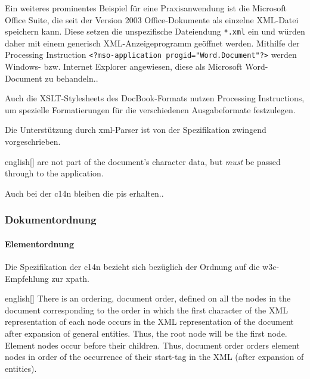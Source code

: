 Ein weiteres prominentes Beispiel für eine Praxisanwendung ist die Microsoft Office Suite, die seit der Version 2003 Office-Dokumente als einzelne XML-Datei speichern kann. Diese setzen die unspezifische Dateiendung \texttt{*.xml} ein und würden daher mit einem generisch XML-Anzeigeprogramm geöffnet werden. Mithilfe der Processing Instruction \texttt{<?mso-application progid="Word.Document"?>} werden Windows- bzw. Internet Explorer angewiesen, diese als Microsoft Word-Document zu behandeln.\cite[Abschnitt 3.2]{tverskov2008understandingpi}.

Auch die XSLT-Stylesheets des DocBook-Formats nutzen Processing Instructions, um spezielle Formatierungen für die verschiedenen Ausgabeformate festzulegen.\cite[{Kapitel \enquote{User Reference: PIs}}]{docbookxsl}

Die Unterstützung durch \acrshort{xml}-Parser ist von der Spezifikation zwingend vorgeschrieben.

\begin{foreigndisplayquote}{english}[{\cite[Abschnitt~2.6]{maler2008xml}}]
 are not part of the document's character data, but \emph{must} be passed through to the application. 
\end{foreigndisplayquote}

Auch bei der \acrlong{c14n} bleiben die \glspl{pi} erhalten.\cite[Abschnitt 2.3]{boyer2001c14n}.

\subsubsection{Dokumentordnung}

\paragraph{Elementordnung}

Die Spezifikation der \acrshort{c14n} bezieht sich bezüglich der Ordnung auf die \acrshort{w3c}-Empfehlung zur \acrfull{xpath}\cite[Abschnitt~2.2]{boyer2001c14n}.

\begin{foreigndisplayquote}{english}[{\cite[Abschnitt~5]{clark1999xpath1}}]
There is an ordering, document order, defined on all the nodes in the document corresponding to the order in which the first character of the XML representation of each node occurs in the XML representation of the document after expansion of general entities. Thus, the root node will be the first node. Element nodes occur before their children. Thus, document order orders element nodes in order of the occurrence of their start-tag in the XML (after expansion of entities).
\end{foreigndisplayquote}

